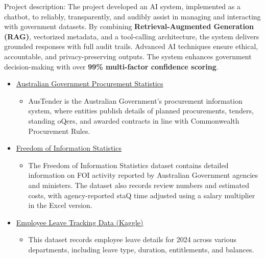 
Project description: The project developed an AI system, implemented as a chatbot, to reliably, transparently, and audibly assist in managing and interacting with government datasets. By combining \textbf{Retrieval-Augmented Generation (RAG)}, vectorized metadata,
and a tool-calling architecture, the system delivers grounded responses with full audit trails. Advanced AI techniques ensure ethical, accountable, and privacy-preserving outputs. The system enhances government decision-making with over
 \textbf{99\% multi-factor confidence scoring}.


\begin{itemize}
    \item \href{https://www.finance.gov.au/government/procurement/statistics-australian-government-procurement-contracts-}{Australian Government Procurement Statistics}
    \begin{itemize}
        \item AusTender is the Australian Government’s procurement information system, where
        entities publish details of planned procurements, tenders, standing oQers, and awarded
        contracts in line with Commonwealth Procurement Rules.
    \end{itemize}
    \item \href{https://www.data.gov.au/data/dataset/freedom-of-information-statistics}{Freedom of Information Statistics}
    \begin{itemize}
        \item The Freedom of Information Statistics dataset contains detailed information on FOI
        activity reported by Australian Government agencies and ministers. The dataset also
        records review numbers and estimated costs, with agency-reported staQ time adjusted
        using a salary multiplier in the Excel version.
    \end{itemize}
    \item \href{https://www.kaggle.com/datasets/manishkumar21324/employee-leave-tracking-data}{Employee Leave Tracking Data (Kaggle)}
    \begin{itemize}
        \item  This dataset records employee leave details for 2024 across various departments,
        including leave type, duration, entitlements, and balances.
    \end{itemize}
\end{itemize}



